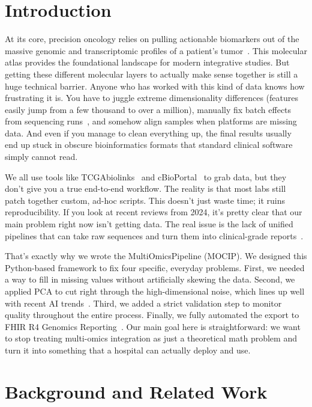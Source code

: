 \documentclass[runningheads]{llncs}
\begin{document}
\section{Introduction}
At its core, precision oncology relies on pulling actionable biomarkers out of the massive genomic and transcriptomic profiles of a patient's tumor~\cite{tomczak2015}. This molecular atlas provides the foundational landscape for modern integrative studies. But getting these different molecular layers to actually make sense together is still a huge technical barrier. Anyone who has worked with this kind of data knows how frustrating it is. You have to juggle extreme dimensionality differences (features easily jump from a few thousand to over a million), manually fix batch effects from sequencing runs~\cite{leek2010}, and somehow align samples when platforms are missing data. And even if you manage to clean everything up, the final results usually end up stuck in obscure bioinformatics formats that standard clinical software simply cannot read.

We all use tools like TCGAbiolinks~\cite{colaprico2016} and cBioPortal~\cite{cerami2012} to grab data, but they don't give you a true end-to-end workflow. The reality is that most labs still patch together custom, ad-hoc scripts. This doesn't just waste time; it ruins reproducibility. If you look at recent reviews from 2024, it's pretty clear that our main problem right now isn't getting data. The real issue is the lack of unified pipelines that can take raw sequences and turn them into clinical-grade reports~\cite{abdelaziz2024multi,hernandez2024methods}.

That's exactly why we wrote the MultiOmicsPipeline (MOCIP). We designed this Python-based framework to fix four specific, everyday problems. First, we needed a way to fill in missing values without artificially skewing the data. Second, we applied PCA to cut right through the high-dimensional noise, which lines up well with recent AI trends~\cite{nam2024harnessing}. Third, we added a strict validation step to monitor quality throughout the entire process. Finally, we fully automated the export to FHIR R4 Genomics Reporting~\cite{mandel2016}. Our main goal here is straightforward: we want to stop treating multi-omics integration as just a theoretical math problem and turn it into something that a hospital can actually deploy and use.

\section{Background and Related Work}
\end{document}
